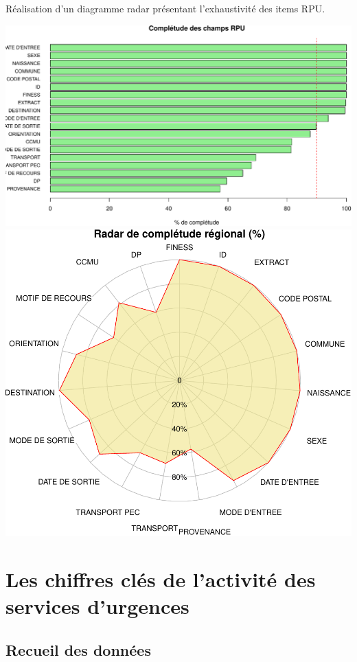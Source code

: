 \documentclass[]{article}
\begin{document}
Réalisation d'un diagramme radar présentant l'exhaustivité des items
RPU.

\includegraphics{rapport2014_V4_files/figure-latex/completude-1.pdf}
\includegraphics{rapport2014_V4_files/figure-latex/completude-2.pdf}

\section{Les chiffres clés de l'activité des services
d'urgences}\label{les-chiffres-cles-de-lactivite-des-services-durgences}

\subsection{Recueil des données}\label{recueil-des-donnees}
\end{document}
